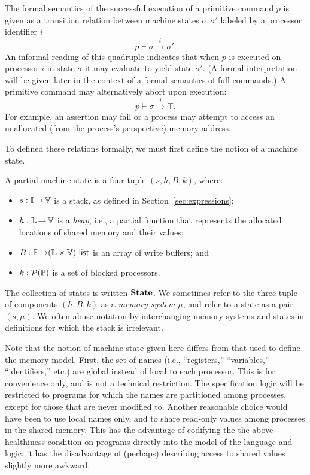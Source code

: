 \documentclass[11pt]{article}
\begin{document}
The formal semantics of the successful execution of a primitive command $p$ is given as a transition relation between machine states $\sigma,\sigma'$ labeled by a processor identifier $i$ \[ p \vdash \sigma \stackrel{i}{\rightarrow} \sigma'. \] An informal reading of this quadruple indicates that when $p$ is executed on processor $i$ in state $\sigma$ it may evaluate to yield state $\sigma'$. (A formal interpretation will be given later in the context of a formal semantics of full commands.) A primitive command may alternatively abort upon execution: \[ p \vdash \sigma \stackrel{i}{\rightarrow} \top. \] For example, an assertion may fail or a process may attempt to access an unallocated (from the process's perspective) memory address. 

To defined these relations formally, we must first define the notion of a machine state. 

\begin{definition}
A partial machine state is a four-tuple $(s,h,B,k)$, where: \begin{itemize}
	\item $s : \mathbb{I} \operatorname{\rightarrow} \mathbb{V}$ is a stack, as defined in Section~\ref{sec:expressions};
	\item $h : \mathbb{L} \operatorname{\rightharpoonup} \mathbb{V}$ is a \emph{heap}, i.e., a partial function that represents the allocated locations of shared memory and their values; 
	\item $B : \mathbb{P} \operatorname{\rightarrow} (\mathbb{L} \times \mathbb{V})~\mathsf{list}$ is an array of write buffers; and
	\item $k : \mathcal{P}(\mathbb{P})$ is a set of blocked processors. 
\end{itemize}
\end{definition} 
The collection of states is written $\mathbf{State}$. We sometimes refer to the three-tuple of components $(h,B,k)$ as a \emph{memory system} $\mu$, and refer to a state as a pair $(s,\mu)$. We often abuse notation by interchanging memory systems and states in definitions for which the stack is irrelevant. 

Note that the notion of machine state given here differs from that used to define the memory model. First, the set of names (i.e., ``registers,'' ``variables,'' ``identifiers,'' etc.) are global instead of local to each processor. This is for convenience only, and is not a technical restriction. The specification logic will be restricted to programs for which the names are partitioned among processes, except for those that are never modified to. Another reasonable choice would have been to use local names only, and to share read-only values among processes in the shared memory. This has the advantage of codifying the the above healthiness condition on programs directly into the model of the language and logic; it has the disadvantage of (perhaps) describing access to shared values slightly more awkward. 
\end{document}
